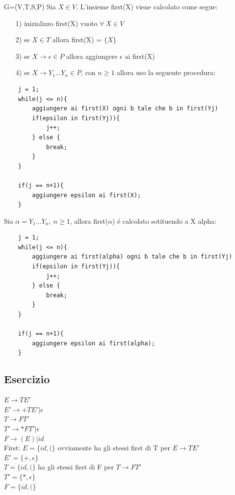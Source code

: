 G=(V,T,S,P)
Sia $X \in V$. L'insieme first(X) viene calcolato come segue:
\begin{itemize}
    \item[1)] inizializzo first(X) vuoto $\forall\ X \in V$\\
    \item[2)] se $X \in T$ allora first(X) = $\{ X \}$\\
    \item[3)] se $X \rightarrow \epsilon \in P$ allora aggiungere $\epsilon$ ai first(X)\\
    \item[4)] se $X \rightarrow Y_1...Y_n \in P$, con $n \geq 1$ allora uso la seguente procedura:\\
\end{itemize}
\begin{lstlisting}
    j = 1;
    while(j <= n){
        aggiungere ai first(X) ogni b tale che b in first(Yj)
        if(epsilon in first(Yj)){
            j++;
        } else {
            break;
        }
    }

    if(j == n+1){
        aggiungere epsilon ai first(X);
    }
\end{lstlisting}

Sia $\alpha=Y_1 ... Y_n,\ n\geq 1$, allora first($\alpha$) \'e calcolato sotituendo a X alpha:
\begin{lstlisting}
    j = 1;
    while(j <= n){
        aggiungere ai first(alpha) ogni b tale che b in first(Yj)
        if(epsilon in first(Yj)){
            j++;
        } else {
            break;
        }
    }

    if(j == n+1){
        aggiungere epsilon ai first(alpha);
    }
\end{lstlisting}

\subsection{Esercizio}
$E \rightarrow T E'$\\
$E' \rightarrow +T E' | \epsilon $\\
$T \rightarrow FT'$\\
$T' \rightarrow *FT'| \epsilon $\\
$F \rightarrow (E)|id $\\

First:
$E = \{ id, ( \}$ ovviamente ha gli stessi first di T per $E \rightarrow T E'$\\
$E' = \{ +, \epsilon \}$\\
$T = \{ id, ( \}$ ha gli stessi first di F per $T \rightarrow FT'$\\
$T' = \{ *, \epsilon \}$\\
$F = \{ id, ( \}$\\


